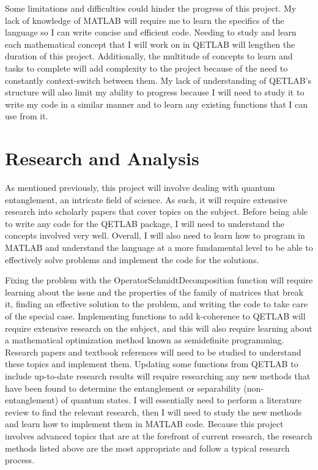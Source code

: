 \documentclass[12pt]{article}
\begin{document}
Some limitations and difficulties could hinder the progress of this project. My lack of knowledge of MATLAB will require me to learn the specifics of the language so I can write concise and efficient code. Needing to study and learn each mathematical concept that I will work on in QETLAB will lengthen the duration of this project. Additionally, the multitude of concepts to learn and tasks to complete will add complexity to the project because of the need to constantly context-switch between them. My lack of understanding of QETLAB's structure will also limit my ability to progress because I will need to study it to write my code in a similar manner and to learn any existing functions that I can use from it.




\section{Research and Analysis}
As mentioned previously, this project will involve dealing with quantum entanglement, an intricate field of science. As such, it will require extensive research into scholarly papers that cover topics on the subject. Before being able to write any code for the QETLAB package, I will need to understand the concepts involved very well. Overall, I will also need to learn how to program in MATLAB and understand the language at a more fundamental level to be able to effectively solve problems and implement the code for the solutions.

Fixing the problem with the OperatorSchmidtDecomposition function will require learning about the issue and the properties of the family of matrices that break it, finding an effective solution to the problem, and writing the code to take care of the special case. Implementing functions to add k-coherence to QETLAB will require extensive research on the subject, and this will also require learning about a mathematical optimization method known as semidefinite programming. Research papers and textbook references will need to be studied to understand these topics and implement them. Updating some functions from QETLAB to include up-to-date research results will require researching any new methods that have been found to determine the entanglement or separability (non-entanglement) of quantum states. I will essentially need to perform a literature review to find the relevant research, then I will need to study the new methods and learn how to implement them in MATLAB code. Because this project involves advanced topics that are at the forefront of current research, the research methods listed above are the most appropriate and follow a typical research process.
\end{document}
